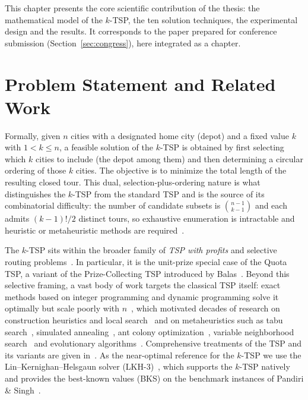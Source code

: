 \documentclass[12pt,a4paper,oneside]{report}
\begin{document}
This chapter presents the core scientific contribution of the thesis: the
mathematical model of the $k$-TSP, the ten solution techniques, the experimental
design and the results. It corresponds to the paper prepared for conference
submission (Section~\ref{sec:congress}), here integrated as a chapter.

\section{Problem Statement and Related Work}
Formally, given $n$ cities with a designated home city (depot) and a fixed value
$k$ with $1<k\le n$, a feasible solution of the $k$-TSP is obtained by first
selecting which $k$ cities to include (the depot among them) and then determining
a circular ordering of those $k$ cities. The objective is to minimize the total
length of the resulting closed tour. This dual, selection-plus-ordering nature is
what distinguishes the $k$-TSP from the standard TSP and is the source of its
combinatorial difficulty: the number of candidate subsets is $\binom{n-1}{k-1}$
and each admits $(k-1)!/2$ distinct tours, so exhaustive enumeration is
intractable and heuristic or metaheuristic methods are required~\cite{lawler1985}.

The $k$-TSP sits within the broader family of \emph{TSP with profits} and
selective routing problems~\cite{feillet2005profits}. In particular, it is the
unit-prize special case of the Quota TSP, a variant of the Prize-Collecting TSP
introduced by Balas~\cite{balas1989pctsp,bienstock1993pctsp}. Beyond this
selective framing, a vast body of work targets the classical TSP itself: exact
methods based on integer programming and dynamic programming solve it optimally
but scale poorly with $n$~\cite{dantzig1954,bellman1962,heldkarp1962,karp1972},
which motivated decades of research on construction heuristics and local
search~\cite{lin1965,christofides1976,bentley1992,johnson1997,laporte1992} and on
metaheuristics such as tabu search~\cite{glover1986,gloverlaguna1997}, simulated
annealing~\cite{kirkpatrick1983,cerny1985}, ant colony
optimization~\cite{dorigo1997acs}, variable neighborhood
search~\cite{mladenovic1997vns} and evolutionary
algorithms~\cite{holland1975adaptation,potvin1996}. Comprehensive treatments of
the TSP and its variants are given in~\cite{gutin2007book,applegate2006concorde}.
As the near-optimal reference for the $k$-TSP we use the
Lin--Kernighan--Helsgaun solver (LKH-3)~\cite{Helsgaun,lin1973,helsgaun2017lkh3},
which supports the $k$-TSP natively and provides the best-known values (BKS) on
the benchmark instances of Pandiri \& Singh~\cite{pandiri2020}.
\end{document}
